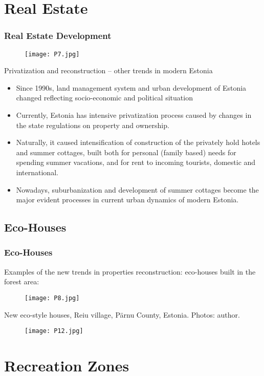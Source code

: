 \documentclass[pdflatex,compress,8pt,
	xcolor={dvipsnames,dvipsnames,svgnames,x11names,table},
	hyperref={	
	breaklinks = true, 
	pdfauthor={Lemenkova Polina}, 
	pdfsubject={Preentation}, 
	pdfcreator={Lemenkova Polina}, 
	pdfproducer={Lemenkova Polina}, 
	colorlinks=true,
	linkcolor=Tomato, 
	citecolor=DeepPink3, 
	urlcolor = NavyBlue, 
	breaklinks = true}]{beamer}
\begin{document}
\section{Real Estate}
\begin{frame}\frametitle{Real Estate Development}
\vspace{3em}
\begin{figure}[H]
	\centering
		\texttt{[image: P7.jpg]}
\end{figure}
Privatization and reconstruction – other trends in modern Estonia
\begin{itemize}
	\item Since 1990s, land management system and urban development of Estonia changed reflecting  socio-economic and political situation
	\item Currently, Estonia has intensive privatization process caused by changes in the state regulations on property and ownership.
	\item Naturally, it caused intensification of construction of the privately hold hotels and summer cottages, built both for personal (family based) needs for spending summer vacations, and for rent to incoming tourists, domestic and international.
	\item Nowadays, suburbanization and development of summer cottages become the major evident processes in current urban dynamics of modern Estonia.
\end{itemize}
\end{frame} 

\subsection{Eco-Houses}
\begin{frame}\frametitle{Eco-Houses}
\vspace{3em}
\small{Examples of the new trends in properties reconstruction: eco-houses built in the forest area: }
\begin{figure}[H]
	\centering
		\texttt{[image: P8.jpg]}
\end{figure}
\small{New eco-style houses, Reiu village, Pärnu County, Estonia. Photos: author}.
\begin{figure}[H]
	\centering
		\texttt{[image: P12.jpg]}
\end{figure}
\end{frame} 

\section{Recreation Zones}
\end{document}
